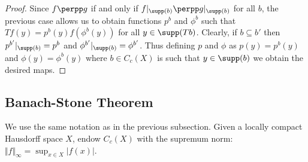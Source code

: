 \begin{proof}
Since $f\perpp g$ if and only if $f|_{\supp(b)}\perpp g|_{\supp(b)}$ for all $b$, the previous case allows us to obtain functions $p^b$ and $\phi^b$ such that $Tf(y)=p^b(y)f(\phi^b(y))$ for all $y\in\supp(Tb)$. Clearly, if $b\subseteq b'$ then $p^{b'}|_{\supp(b)}=p^b$ and $\phi^{b'}|_{\supp(b)}=\phi^{b'}$. Thus defining $p$ and $\phi$ as $p(y)=p^b(y)$ and $\phi(y)=\phi^b(y)$ where $b\in C_c(X)$ is such that $y\in\supp(b)$ we obtain the desired maps.\qedhere



\end{proof}


\subsection{Banach-Stone Theorem}\label{subsectionbanachstone}

We use the same notation as in the previous subsection. Given a locally compact Hausdorff space $X$, endow $C_c(X)$ with the supremum norm: $\Vert f\Vert_\infty=\sup_{x\in X}|f(x)|$.%

